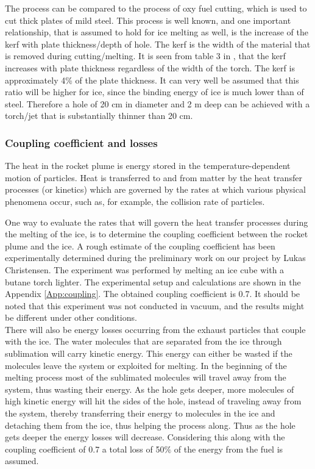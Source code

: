 The process can be compared to the process of oxy fuel cutting, which is used to cut thick plates of mild steel. This process is well known, and one important relationship, that is assumed to hold for ice melting as well, is the increase of the kerf with plate thickness/depth of hole. The kerf is the width of the material that is removed during cutting/melting. It is seen from table 3 in \cite{oxy_fuel}, that the kerf increases with plate thickness regardless of the width of the torch. The kerf is approximately 4\% of the plate thickness. It can very well be assumed that this ratio will be higher for ice, since the binding energy of ice is much lower than of steel. Therefore a hole of 20 cm in diameter and 2 m deep can be achieved  with a torch/jet that is substantially thinner than 20 cm. 

\subsubsection{Coupling coefficient and losses}
The heat in the rocket plume is energy stored in the temperature-dependent motion of particles. Heat is transferred to and from matter by the heat transfer processes (or kinetics) which are governed by the rates at which various physical phenomena occur, such as, for example, the collision rate of particles. 

One way to evaluate the rates that will govern the heat transfer processes during the melting of the ice, is to determine the coupling coefficient between the rocket plume and the ice. A rough estimate of the coupling coefficient has been experimentally determined during the preliminary work on our project by Lukas Christensen. The experiment was performed by melting an ice cube with a butane torch lighter. The experimental setup and calculations are shown in the Appendix \ref{App:coupling}. The obtained coupling coefficient is 0.7. It should be noted that this experiment was not conducted in vacuum, and the results might be different under other conditions. \\

There will also be energy losses occurring from the exhaust particles that couple with the ice. The water molecules that are separated from the ice through sublimation will carry kinetic energy. This energy can either be wasted if the molecules leave the system or exploited for melting. In the beginning of the melting process most of the sublimated molecules will travel away from the system, thus wasting their energy. As the hole gets deeper, more molecules of high kinetic energy will hit the sides of the hole, instead of traveling away from the system, thereby transferring their energy to molecules in the ice and detaching them from the ice, thus helping the process along. Thus as the hole gets deeper the energy losses will decrease. Considering this along with the coupling coefficient of 0.7 a total loss of 50$\%$ of the energy from the fuel is assumed. 

